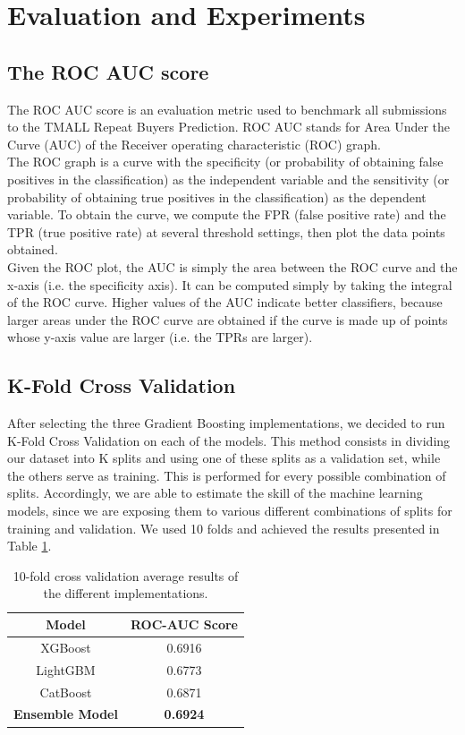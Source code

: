 \documentclass{article}
\begin{document}
\section{Evaluation and Experiments}
\subsection{The ROC AUC score}
The ROC AUC score is an evaluation metric used to benchmark all submissions to the TMALL Repeat Buyers Prediction. ROC AUC stands for Area Under the Curve (AUC) of the Receiver operating characteristic (ROC) graph.\\
The ROC graph is a curve with the specificity (or probability of obtaining false positives in the classification) as the independent variable and the sensitivity (or probability of obtaining true positives in the classification) as the dependent variable. To obtain the curve, we compute the FPR (false positive rate) and the TPR (true positive rate) at several threshold settings, then plot the data points obtained.\\
Given the ROC plot, the AUC is simply the area between the ROC curve and the x-axis (i.e. the specificity axis). It can be computed simply by taking the integral of the ROC curve. Higher values of the AUC indicate better classifiers, because larger areas under the ROC curve are obtained if the curve is made up of points whose y-axis value are larger (i.e. the TPRs are larger).

\subsection{K-Fold Cross Validation} \label{subkfold}

After selecting the three Gradient Boosting implementations, we decided to run K-Fold Cross Validation on each of the models. This method consists in dividing our dataset into K splits and using one of these splits as a validation set, while the others serve as training. This is performed for every possible combination of splits. Accordingly, we are able to estimate the skill of the machine learning models, since we are exposing them to various different combinations of splits for training and validation. We used 10 folds and achieved the results presented in Table \ref{tab:score}. 

\begin{table}[h!]
\centering
\setlength{\extrarowheight}{3pt}
\begin{tabular}{|c|c|}
    \hline
    \textbf{Model} & \textbf{ROC-AUC Score}\\
    \hline
    XGBoost & 0.6916\\
    \hline
    LightGBM & 0.6773\\
    \hline
    CatBoost & 0.6871\\
    \hline
    \textbf{Ensemble Model} & \textbf{0.6924}\\
    \hline
\end{tabular}
\vspace{0.3cm}
\caption{10-fold cross validation average results of the different implementations.}
\label{tab:score}
\end{table}
\vspace{-0.4cm}
\end{document}
